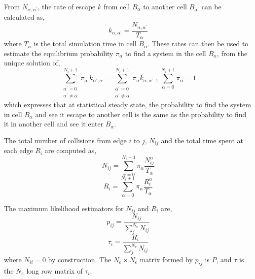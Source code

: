 \documentclass{article}
\begin{document}
From $N_{\alpha, \alpha^{\prime}}$, the rate of escape $k$ from cell $B_{\alpha}$ to another cell $B_{\alpha^{\prime}}$ can be calculated as,
%
\begin{equation} \label{eq:35}
k_{\alpha, \alpha^{\prime}} = \dfrac{N_{\alpha, \alpha^{\prime}}}{T_{\alpha}}
\end{equation}
%
where $T_{\alpha}$ is the total simulation time in cell $B_{\alpha}$. These rates can then be used to estimate the equilibrium probability $\pi_{\alpha}$ to find a system in the cell $B_{\alpha}$, from the unique solution of,
%
\begin{equation} \label{eq:36}
\sum_{\substack{\alpha^{\prime} = 0 \\ \alpha^{\prime} \neq \alpha}}^{N_i + 1} \pi_{\alpha^{\prime}} k_{\alpha^{\prime}, \alpha} = \sum_{\substack{\alpha^{\prime} = 0 \\ \alpha^{\prime} \neq \alpha}}^{N_i + 1} \pi_{\alpha} k_{\alpha, \alpha^{\prime}} \text{   ,   } \sum_{\alpha = 0}^{N_i + 1} \pi_{\alpha} = 1
\end{equation}
%
which expresses that at statistical steady state, the probability to find the system in cell $B_{\alpha}$ and see it escape to another cell is the same as the probability to find it in another cell and see it enter $B_{\alpha}$.

The total number of collisions from edge $i$ to $j$, $N_{ij}$ and the total time spent at each edge $R_i$ are computed as,
%
\begin{equation} \label{eq:37}
N_{ij} = \sum_{\alpha = 0}^{N_i +1} \pi_{\alpha} \dfrac{N_{ij}^{\alpha}}{T_{\alpha}}
\end{equation}
\begin{equation} \label{eq:38}
R_{i} = \sum_{\alpha = 0}^{N_i +1} \pi_{\alpha} \dfrac{R_{i}^{\alpha}}{T_{\alpha}}
\end{equation}
%

The maximum likelihood estimators \cite{Myung2003} for $N_{ij}$ and $R_i$ are,
%
\begin{equation} \label{eq:39}
p_{ij} =\dfrac{N_{ij}}{\sum_{j}^{N_e} N_{ij}}
\end{equation}
\begin{equation} \label{eq:40}
\tau_{i} =\dfrac{R_{i}}{\sum_{j}^{N_e} N_{ij}}
\end{equation}
%
where $N_{ii} = 0$ by construction. The $N_e \times N_e$ matrix formed by $p_{ij}$ is $P$, and $\tau$ is the $N_e$ long row matrix of $\tau_i$.
\end{document}
